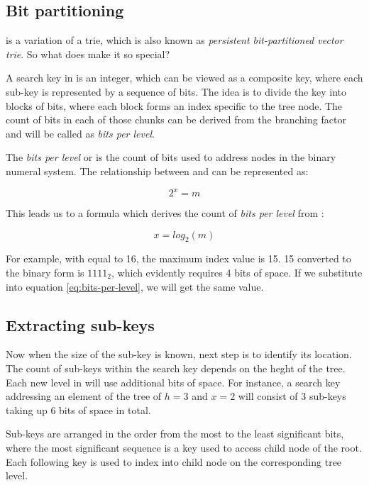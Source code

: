\subsection*{Bit partitioning}

\rbtree is a variation of a trie, which is also known as \emph{persistent bit-partitioned vector trie}. So what does make it so special? 

A search key in \rbtree is an integer, which can be viewed as a composite key, where each sub-key is represented by a sequence of bits. The idea is to divide the key into blocks of bits, where each block forms an index specific to the tree node. The count of bits in each of those chunks can be derived from the branching factor and will be called as \emph{bits per level}.

The \emph{bits per level} or \x is the count of bits used to address \m nodes in the binary numeral system. The relationship between \m and \x can be represented as: 

\begin{equation}
    2^x = m
\end{equation}

This leads us to a formula which derives the count of \emph{bits per level} from \m: 

\begin{equation}
    \label{eq:bits-per-level}
    x = log_2(m)
\end{equation}

For example, with \m equal to 16, the maximum index value is 15. 15 converted to the binary form is $1111_2$, which evidently requires 4 bits of space. If we substitute \m into equation \ref{eq:bits-per-level}, we will get the same value. 

\subsection*{Extracting sub-keys}

Now when the size of the sub-key is known, next step is to identify its location. The count of sub-keys within the search key depends on the heght of the tree. Each new level in \rbtree will use \x additional bits of space. For instance, a search key addressing an element of the tree of ${h = 3}$ and ${x = 2}$ will consist of 3 sub-keys taking up 6 bits of space in total.

Sub-keys are arranged in the order from the most to the least significant bits, where the most significant sequence is a key used to access child node of the root. Each following key is used to index into child node on the corresponding tree level.

